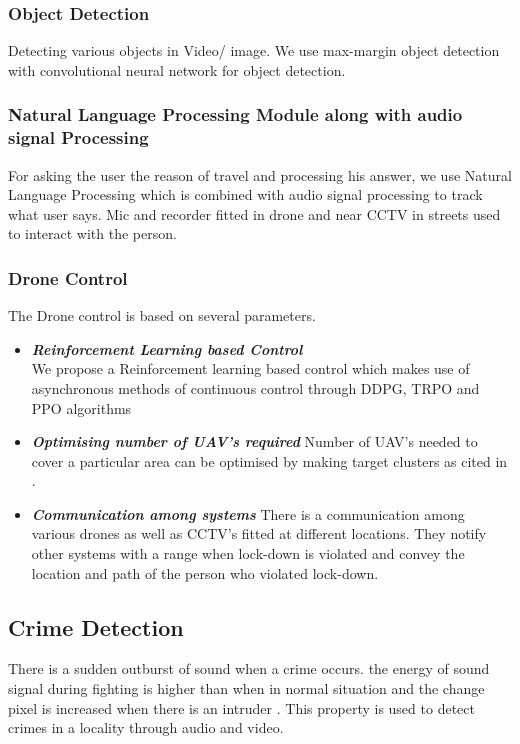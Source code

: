 \documentclass[10pt,twocolumn,letterpaper]{article}
\begin{document}
\subsubsection{Object Detection} 
Detecting various objects in Video/ image. We use max-margin object detection with convolutional neural network for object detection.
\subsubsection{Natural Language Processing Module along with audio signal Processing} 
For asking the user the reason of travel and processing his answer, we use Natural Language Processing which is combined with audio signal processing to track what user says.
Mic and recorder fitted in drone and near CCTV in streets used to interact with the person.
\subsubsection{Drone Control} 
The Drone control is based on several parameters.
\begin{itemize}

\item \textbf{\emph{ Reinforcement Learning based Control}}\\
We propose a Reinforcement learning based control which makes use of asynchronous methods of continuous control through DDPG, TRPO and PPO algorithms\cite{article}
\item \textbf{\emph{Optimising number of UAV's required}}
Number of UAV's needed to cover a particular area can be optimised by making target clusters as cited in  \cite{1618950}.

\item \textbf{\emph{Communication among systems}}
There is a communication among various drones as well as CCTV's fitted at different locations. They notify other systems with a range when lock-down is violated and convey the location and path of the person who violated lock-down. 
\end{itemize}
\subsection{Crime Detection}
There is a sudden outburst of sound when a crime occurs. the energy of sound signal during fighting is higher than when in normal situation and the change pixel is increased when there is an intruder \cite{6704220}. This property is used to detect crimes in a locality through audio and video.
\end{document}

